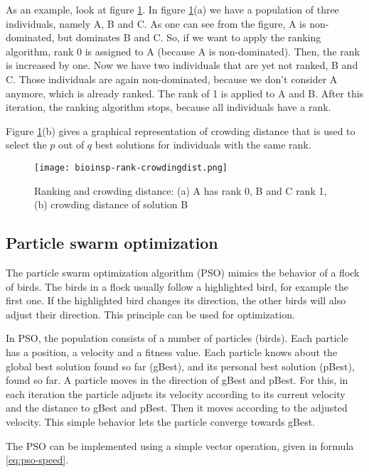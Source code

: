 As an example, look at figure \ref{fig:rank-crowdingdist}. In figure \ref{fig:rank-crowdingdist}(a) we have a population of three individuals, namely A, B and C. As one can see from the figure, A is non-dominated, but dominates B and C. So, if we want to apply the ranking algorithm, rank 0 is assigned to A (because A is non-dominated). Then, the rank is increased by one. Now we have two individuals that are yet not ranked, B and C. Those individuals are again non-dominated, because we don't consider A anymore, which is already ranked. The rank of 1 is applied to A and B. After this iteration, the ranking algorithm stops, because all individuals have a rank.

Figure \ref{fig:rank-crowdingdist}(b) gives a graphical representation of crowding distance that is used to select the $p$ out of $q$ best solutions for individuals with the same rank.

\begin{figure}[ht!]
  \centering
  \texttt{[image: bioinsp-rank-crowdingdist.png]}
  \caption{Ranking and crowding distance: (a) A has rank 0, B and C rank 1, (b) crowding distance of solution B}
  \label{fig:rank-crowdingdist}
\end{figure}

\subsection{Particle swarm optimization}
The particle swarm optimization algorithm (PSO) mimics the behavior of a flock of birds. The birds in a flock usually follow a highlighted bird, for example the first one. If the highlighted bird changes its direction, the other birds will also adjust their direction. This principle can be used for optimization.

In PSO, the population consists of a number of particles (birds). Each particle has a position, a velocity and a fitness value. Each particle knows about the global best solution found so far (gBest), and its personal best solution (pBest), found so far. A particle moves in the direction of gBest and pBest. For this, in each iteration the particle adjusts its velocity according to its current velocity and the distance to gBest and pBest. Then it moves according to the adjusted velocity. This simple behavior lets the particle converge towards gBest.

The PSO can be implemented using a simple vector operation, given in formula \eqref{eq:pso-speed}.

